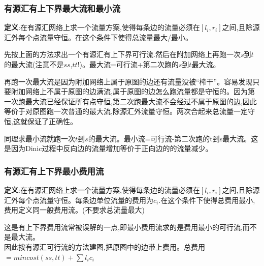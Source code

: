 \documentclass[12pt, a4paper, oneside]{ctexart}
\begin{document}
\subsubsection{有源汇有上下界最大流和最小流}
\textbf{定义}:在有源汇网络上求一个流量方案,使得每条边的流量必须在$[l_{i},r_{i}]$之间,且除源汇外每个点流量守恒。在这个条件下使得总流量最大/最小。\par
先按上面的方法求出一个有源汇有上下界可行流.然后在附加网络上再跑一次$s$到$t$的最大流(注意不是$ss$,$tt$!)。最大流=可行流+第二次跑的$s$到$t$最大流。\par
再跑一次最大流是因为附加网络上属于原图的边还有流量没被“榨干”。容易发现只要附加网络上不属于原图的边满流,属于原图的边怎么跑流量都是守恒的。因为第一次跑最大流已经保证所有点守恒,第二次跑最大流不会经过不属于原图的边,因此等价于对原图跑一次普通的最大流,除源汇外流量守恒。两次合起来总流量一定守恒,这就保证了正确性。\par
同理求最小流就跑一次$t$到$s$的最大流。最小流=可行流-第二次跑的t到s最大流。这是因为Dinic过程中反向边的流量增加等价于正向边的的流量减少。

\subsubsection{有源汇有上下界最小费用流}
\textbf{定义}:在有源汇网络上求一个流量方案,使得每条边的流量必须在$[l_{i},r_{i}]$之间,且除源汇外每个点流量守恒。每条边单位流量的费用为$c_{i}$.在这个条件下使得总费用最小,费用定义同一般费用流。(不要求总流量最大)\par
这是有上下界费用流常被误解的一点,即最小费用流求的是费用最小的可行流,而不是最大流。\\

因此按有源汇可行流的方法建图,把原图中的边带上费用。总费用$=mincost(ss,tt)+\sum{l_{i}c_{i}}$
\end{document}
